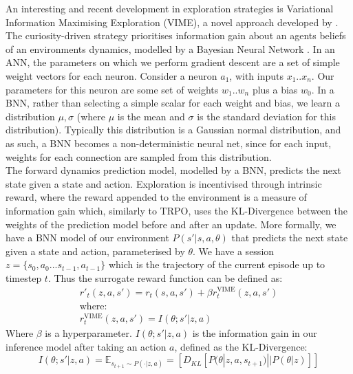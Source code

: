 \documentclass[12pt]{article}
\begin{document}
An interesting and recent development in exploration strategies is Variational Information Maximising Exploration (VIME), a novel approach developed by \textcite{houthooft2016vime}. The curiosity-driven strategy prioritises information gain about an agents beliefs of an environments dynamics, modelled by a Bayesian Neural Network \autocite{NIPS2011_7eb3c8be}. In an ANN, the parameters on which we perform gradient descent are a set of simple weight vectors for each neuron. Consider a neuron $a_1$, with inputs $x_1..x_n$. Our parameters for this neuron are some set of weights $w_1..w_n$ plus a bias $w_0$. In a BNN, rather than selecting a simple scalar for each weight and bias, we learn a distribution $\mu,\sigma$ (where $\mu$ is the mean and $\sigma$ is the standard deviation for this distribution). Typically this distribution is a Gaussian normal distribution, and as such, a BNN becomes a non-deterministic neural net, since for each input, weights for each connection are sampled from this distribution. \\\newline
The forward dynamics prediction model, modelled by a BNN, predicts the next state given a state and action. Exploration is incentivised through intrinsic reward, where the reward appended to the environment is a measure of information gain which, similarly to TRPO, uses the KL-Divergence between the weights of the prediction model before and after an update. More formally, we have a BNN model of our environment $P(s'|s,a,\theta)$ that predicts the next state given a state and action, parameterised by $\theta$. We have a session $z = \{s_0,a_0...s_{t-1},a_{t-1}\}$ which is the trajectory of the current episode up to timestep $t$. 
Thus the surrogate reward function can be defined as:
\begin{equation}
    \begin{gathered}
        r'_t(z,a,s') = r_t(s,a,s') + \beta r^{\text{VIME}}_t(z,a,s')\\
        \text{where:}\\
        r^{\text{VIME}}_t(z,a,s') = I(\theta;s'|z,a)
    \end{gathered}
\end{equation}
Where $\beta$ is a hyperparameter. $I(\theta;s'|z,a)$ is the information gain in our inference model after taking an action $a$, defined as the KL-Divergence: 
\begin{equation}
    I(\theta;s'|z,a) = \mathbb{E}_{s_{t+1} \sim P(\cdot|z,a)} = [D_{KL}[P(\theta | z, a, s_{t+1}) || P(\theta | z)]]
\end{equation}
\end{document}
